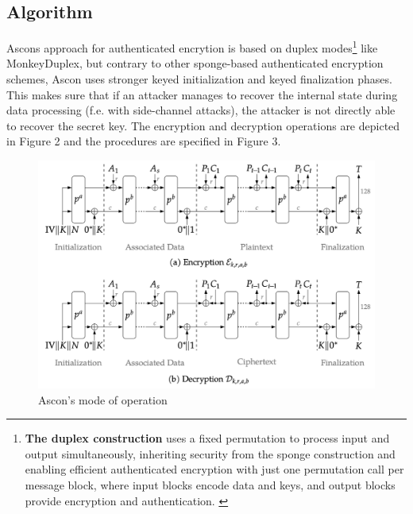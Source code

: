 \subsection{Algorithm}
\sloppy
Ascons approach for authenticated encrytion is based on duplex modes\footnote[3]{\textbf{The duplex construction} uses a fixed permutation to process input and output simultaneously, inheriting security from the sponge construction and enabling efficient authenticated encryption with just one permutation call per message block, where input blocks encode data and keys, and output blocks provide encryption and authentication. \cite{10.1007/978-3-642-28496-0_19}} like MonkeyDuplex, but contrary to other sponge-based authenticated encryption schemes, Ascon uses stronger keyed initialization and keyed finalization phases. This makes sure that if an attacker manages to recover the internal state during data processing (f.e. with side-channel attacks), the attacker is not directly able to recover the secret key. \cite[Chapter 5.1]{DBLP:journals/joc/DobraunigEMS21}
The encryption and decryption operations are depicted in Figure 2 and the procedures are specified in Figure 3. \cite{DBLP:journals/joc/DobraunigEMS21}
\begin{figure}[H]
    \centering
    \includegraphics[width=1\textwidth]{figures/aead-algorithm.png}
    \caption{Ascon's mode of operation \cite{DBLP:journals/joc/DobraunigEMS21}}
    \label{fig:aead-algorithm}
\end{figure}


